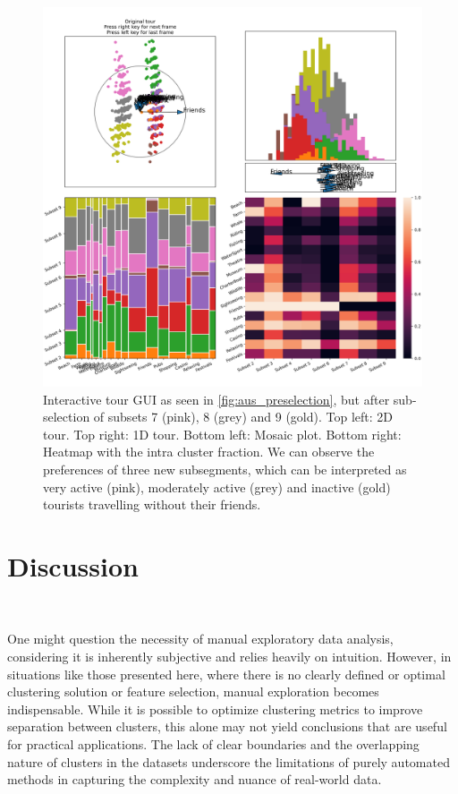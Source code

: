 \documentclass[article]{ajs}
\begin{document}
\begin{figure}[h!]
    \centering
    \includegraphics[width=1\textwidth]{aus_selection.png}
    \caption{Interactive tour GUI as seen in \ref{fig:aus_preselection}, but after sub-selection of subsets 7 (pink), 8 (grey) and 9 (gold). Top left: 2D tour. Top right: 1D tour. Bottom left: Mosaic plot. Bottom right: Heatmap with the intra cluster fraction. We can observe the preferences of three new subsegments, which can be interpreted as very active (pink), moderately active (grey) and inactive (gold) tourists travelling without their friends.}
    \label{fig:aus_selection}
\end{figure}


\section{Discussion}~\label{discussion}

One might question the necessity of manual exploratory data analysis, considering it is inherently subjective and relies heavily on intuition. However, in situations like those presented here, where there is no clearly defined or optimal clustering solution or feature selection, manual exploration becomes indispensable. While it is possible to optimize clustering metrics to improve separation between clusters, this alone may not yield conclusions that are useful for practical applications. The lack of clear boundaries and the overlapping nature of clusters in the datasets underscore the limitations of purely automated methods in capturing the complexity and nuance of real-world data.
\end{document}
